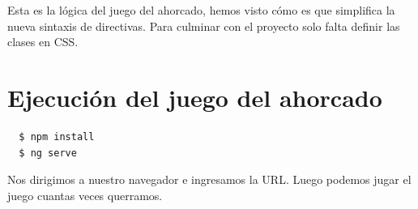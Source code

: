 \documentclass[10pt, a4paper]{article}
\begin{document}
Esta es la lógica del juego del ahorcado, hemos visto cómo es que simplifica la nueva sintaxis de directivas. Para culminar con el proyecto solo falta definir las clases en CSS.

\section{Ejecución del juego del ahorcado}

\begin{verbatim}
  $ npm install
  $ ng serve
\end{verbatim}

Nos dirigimos a nuestro navegador e ingresamos la URL. Luego podemos jugar el juego cuantas veces querramos.

\end{document}
